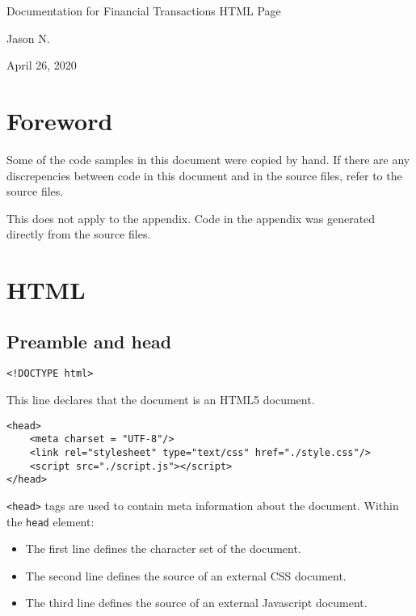 \documentclass[letterpaper]{article}
\begin{document}
\vspace*{\fill}
\begin{center}
    \Large
    Documentation for Financial Transactions HTML Page

    \large
    Jason N.

    April 26, 2020
\end{center}
\vspace*{\fill}

\newpage
{}
\tableofcontents

\newpage
{}
\parskip 10pt

\section{Foreword}

Some of the code samples in this document were copied by hand.
If there are any discrepencies between code in this document and in the source files, refer to the source files.

This does not apply to the appendix.
Code in the appendix was generated directly from the source files.

\section{HTML}\label{HTML}

\subsection{Preamble and head}

\begin{lstlisting}[firstnumber=1]
<!DOCTYPE html>
\end{lstlisting}

This line declares that the document is an HTML5 document.

\begin{lstlisting}[firstnumber=2]
<head>
    <meta charset = "UTF-8"/>
    <link rel="stylesheet" type="text/css" href="./style.css"/>
    <script src="./script.js"></script>
</head>
\end{lstlisting}

\lstinline{<head>} tags are used to contain meta information about the document.
Within the \lstinline{head} element:

\begin{itemize}
    \item The first line defines the character set of the document.
    \item The second line defines the source of an external CSS document.
    \item The third line defines the source of an external Javascript document.
\end{itemize}
\end{document}
